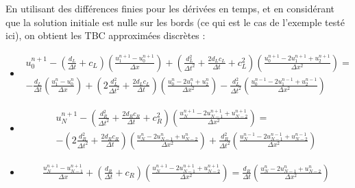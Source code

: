 \indent En utilisant des différences finies pour les dérivées en temps, et en considérant que la solution initiale est nulle sur les bords (ce qui est le cas de l'exemple testé ici), on obtient les TBC approximées discrètes : 

\begin{itemize}
 \item \begin{equation*}
\label{eq:appDiscTBCP1}
	\begin{aligned}
    u_0^{n+1} - \left( \frac{d_L}{\Delta t} + c_L \right) \left( \frac{u_1^{n+1} - u_0^{n+1}}{\Delta x}\right) +   \left( \frac{d_L^2}{\Delta t^2} + \frac{2d_Lc_L}{\Delta t} + c_L^2  \right) \left(  \frac{u_0^{n+1} - 2u_1^{n+1} + u_2^{n+1}}{\Delta x^2} \right)  = \\
        -\frac{d_L}{\Delta t}\left( \frac{u_1^{n} - u_0^{n}}{\Delta x}\right) +  \left( 2\frac{d_L^2}{\Delta t^2} + \frac{2d_Lc_L}{\Delta t}\right) \left(  \frac{u_0^{n} - 2u_1^n + u_2^{n}}{\Delta x^2} \right)    -  \frac{d_L^2}{\Delta t^2} \left(  \frac{u_0^{n-1} - 2u_1^{n-1} + u_2^{n-1}}{\Delta x^2} \right)
   \end{aligned}
\end{equation*} 

\item \begin{equation*}
	\begin{aligned}
    u_N^{n+1} - \left( \frac{d_R^2}{\Delta t^2} + \frac{2d_Rc_R}{\Delta t} + c_R^2  \right) \left(  \frac{u_{N}^{n+1} - 2u_{N-1}^{n+1} + u_{N-2}^{n+1}}{\Delta x^2} \right) = \\
     -\left( 2\frac{d_R^2}{\Delta t^2} + \frac{2d_Rc_R}{\Delta t}\right) \left(  \frac{u_N^{n} - 2u_{N-1}^n + u_{N-2}^{n}}{\Delta x^2} \right) + \frac{d_R^2}{\Delta t^2} \left(  \frac{u_N^{n-1} - 2u_{N-1}^{n-1} + u_{N-2}^{n-1}}{\Delta x^2} \right)
    \end{aligned}
\end{equation*} 
   
\item \begin{equation*}
	\begin{aligned}	
    \frac{u_N^{n+1} - u_{N-1}^{n+1}}{\Delta x} + \left( \frac{d_R}{\Delta t} + c_R \right) \left( \frac{u_N^{n+1} -2 u_{N-1}^{n+1} + u_{N-2}^{n+1}}{\Delta x^2}\right) =      \frac{d_R}{\Delta t}\left( \frac{u_{N}^{n} - 2u_{N-1}^{n} + u_{N-2}^n}{\Delta x^2}\right)
    \end{aligned}
\end{equation*}

\end{itemize}

